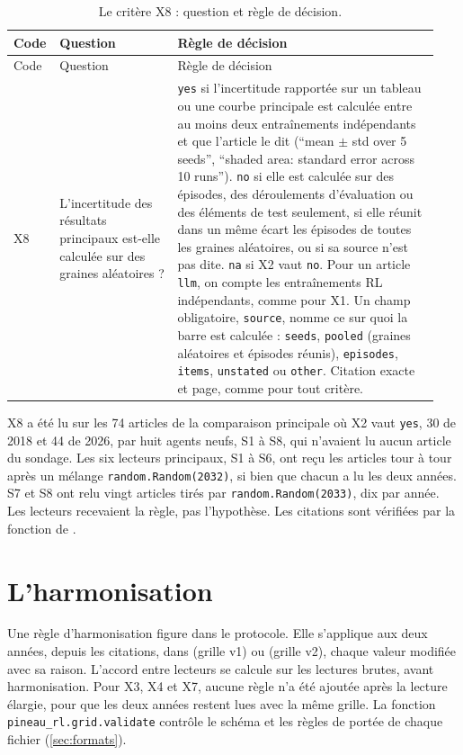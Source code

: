 \begin{small}
\begin{longtable}{@{}p{0.07\linewidth}>{\raggedright\arraybackslash}p{0.27\linewidth}>{\raggedright\arraybackslash}p{0.6\linewidth}@{}}
\caption{Le critère X8 : question et règle de décision.}\label{tab:a-grille-x8}\\
\toprule
Code & Question & Règle de décision \\
\midrule
\endfirsthead
\toprule
Code & Question & Règle de décision \\
\midrule
\endhead
\bottomrule
\endfoot
X8 & L'incertitude des résultats principaux est-elle calculée sur des graines aléatoires ? &
  \texttt{yes} si l'incertitude rapportée sur un tableau ou une courbe principale est calculée entre
  au moins deux entraînements indépendants et que l'article le dit (\enquote{mean $\pm$ std over 5
  seeds}, \enquote{shaded area: standard error across 10 runs}). \texttt{no} si elle est calculée sur des épisodes, des déroulements d'évaluation ou des éléments de test seulement, si elle réunit dans un
  même écart les épisodes de toutes les graines aléatoires, ou si sa source n'est pas dite.
  \texttt{na} si X2 vaut \texttt{no}. Pour un article \texttt{llm}, on compte les entraînements RL
  indépendants, comme pour X1. Un champ obligatoire, \texttt{source}, nomme ce sur quoi la barre
  est calculée : \texttt{seeds}, \texttt{pooled} (graines aléatoires et épisodes réunis),
  \texttt{episodes}, \texttt{items}, \texttt{unstated} ou \texttt{other}. Citation exacte et page,
  comme pour tout critère. \\
\end{longtable}
\end{small}

X8 a été lu sur les 74 articles de la comparaison principale où X2 vaut \texttt{yes}, 30 de 2018 et
44 de 2026, par huit agents neufs, S1 à S8, qui n'avaient lu aucun article du sondage. Les six lecteurs
principaux, S1 à S6, ont reçu les articles tour à tour après un mélange \texttt{random.Random(2032)},
si bien que chacun a lu les deux années. S7 et S8 ont relu vingt articles tirés par
\texttt{random.Random(2033)}, dix par année. Les lecteurs recevaient la règle, pas l'hypothèse. Les
citations sont vérifiées par la fonction de .

\section{L'harmonisation}
\label{sec:a-harmonisation}

Une règle d'harmonisation figure dans le protocole. Elle s'applique aux deux années, depuis les citations, dans 
(grille v1) ou  (grille v2), chaque valeur modifiée avec sa raison.
L'accord entre lecteurs se calcule sur les lectures brutes, avant harmonisation. Pour X3, X4 et X7,
aucune règle n'a été ajoutée après la lecture élargie, pour que les deux années restent lues avec la
même grille. La fonction \texttt{pineau\_rl.grid.validate} contrôle le schéma et les règles
de portée de chaque fichier (\cref{sec:formats}).
